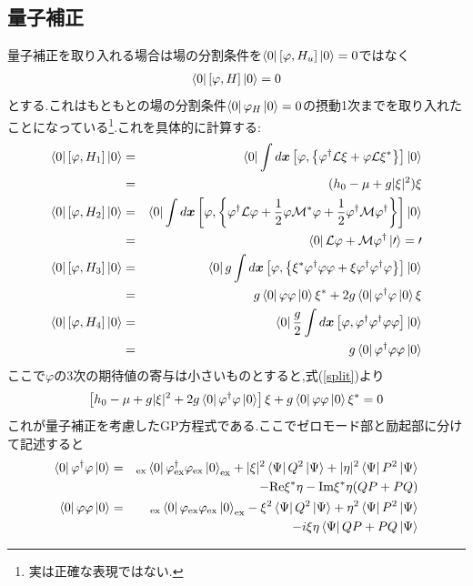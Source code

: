 \documentclass[10.5pt,a4paper]{jreport}
\begin{document}
\subsection{量子補正}
量子補正を取り入れる場合は場の分割条件を$\bra{0}[\varphi,H_u]\ket{0}=0$ではなく
\begin{eqnarray}
  \bra{0}[\varphi,H]\ket{0} = 0 \label{split}
\end{eqnarray}
とする.これはもともとの場の分割条件$\bra{0}\varphi_H\ket{0} = 0$の摂動1次までを取り入れたことになっている\footnote{実は正確な表現ではない. }.これを具体的に計算する:
\begin{eqnarray}
  \nonumber  \bra{0}[\varphi,H_1]\ket{0} &=& \bra{0}\int d\bm{x}\left[\varphi,\left\{\varphi^\dagger{\cal L}\xi+\varphi{\cal L}\xi^*\right\}\right]\ket{0}\\
  &=& (h_0 - \mu + g|\xi|^2)\xi\\
  \nonumber  \bra{0}[\varphi,H_2]\ket{0} &=& \bra{0}\int d\bm{x}\left[\varphi,\left\{\varphi^\dagger{\cal L}\varphi+\frac{1}{2}\varphi{\cal M}^*\varphi + \frac{1}{2}\varphi^\dagger{\cal M}\varphi^\dagger\right\}\right]\ket{0}\\
  &=& \bra{0}{\cal L}\varphi + {\cal M}\varphi^\dagger \ket{0} = 0\\
  \nonumber  \bra{0}[\varphi,H_3]\ket{0} &=& \bra{0}g\int d\bm{x}\left[\varphi,\left\{\xi^*\varphi^\dagger\varphi\varphi + \xi\varphi^\dagger\varphi^\dagger\varphi \right\}\right]\ket{0}\\
  &=& g\bra{0}\varphi\varphi\ket{0}\xi^* + 2g\bra{0}\varphi^\dagger\varphi\ket{0}\xi\\
  \nonumber  \bra{0}[\varphi,H_4]\ket{0} &=& \bra{0}\frac{g}{2}\int d\bm{x}\left[\varphi,\varphi^\dagger\varphi^\dagger\varphi\varphi\right]\ket{0}\\
  &=& g\bra{0}\varphi^\dagger\varphi\varphi\ket{0}
\end{eqnarray}
ここで$\varphi$の3次の期待値の寄与は小さいものとすると,式(\ref{split})より
\begin{eqnarray}
  \left[h_0 - \mu + g|\xi|^2 + 2g\bra{0}\varphi^\dagger\varphi\ket{0}\right]\xi + g\bra{0}\varphi\varphi\ket{0}\xi^* = 0
\end{eqnarray}
これが量子補正を考慮したGP方程式である.ここでゼロモード部と励起部に分けて記述すると
\begin{eqnarray}
 \nonumber \bra{0}\varphi^\dagger\varphi\ket{0} &=& _{\rm ex}\bra{0}\varphi^\dagger_{\rm ex}\varphi_{\rm ex}\ket{0}_{\rm ex} + |\xi|^2\bra{\Psi}Q^2\ket{\Psi} + |\eta|^2\bra{\Psi}P^2\ket{\Psi} \\
  &&\ \ \ \ \ \ \ \ -{\rm Re}\xi^*\eta -{\rm Im}\xi^*\eta(QP + PQ)\\
\nonumber  \bra{0}\varphi\varphi\ket{0} &=& _{\rm ex}\bra{0}\varphi_{\rm ex}\varphi_{\rm ex}\ket{0}_{\rm ex} - \xi^2\bra{\Psi}Q^2\ket{\Psi} + \eta^2\bra{\Psi}P^2\ket{\Psi} \\
  &&\ \ \ \ \ \ \ \ -i\xi\eta\bra{\Psi}QP + PQ\ket{\Psi}
\end{eqnarray}
\end{document}
